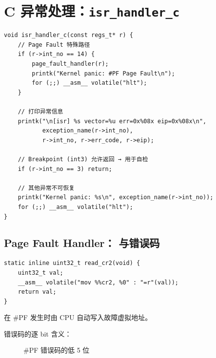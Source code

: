\section{C 异常处理：\texttt{isr\_handler\_c}}

\begin{lstlisting}[style=cstyle]
void isr_handler_c(const regs_t* r) {
    // Page Fault 特殊路径
    if (r->int_no == 14) {
        page_fault_handler(r);
        printk("Kernel panic: #PF Page Fault\n");
        for (;;) __asm__ volatile("hlt");
    }

    // 打印异常信息
    printk("\n[isr] %s vector=%u err=0x%08x eip=0x%08x\n",
           exception_name(r->int_no),
           r->int_no, r->err_code, r->eip);

    // Breakpoint (int3) 允许返回 → 用于自检
    if (r->int_no == 3) return;

    // 其他异常不可恢复
    printk("Kernel panic: %s\n", exception_name(r->int_no));
    for (;;) __asm__ volatile("hlt");
}
\end{lstlisting}

\subsection{Page Fault Handler： 与错误码}

\begin{lstlisting}[style=cstyle]
static inline uint32_t read_cr2(void) {
    uint32_t val;
    __asm__ volatile("mov %%cr2, %0" : "=r"(val));
    return val;
}
\end{lstlisting}

 在 \#PF 发生时由 CPU 自动写入故障虚拟地址。

错误码的逐 bit 含义：

\begin{figure}[H]
  \centering
  
  \caption{\#PF 错误码的低 5 位}
\end{figure}

\begin{bitfield}
\end{bitfield}

